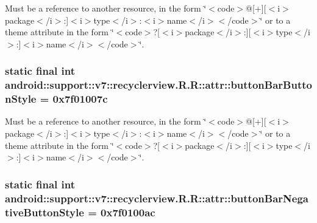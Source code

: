 Must be a reference to another resource, in the form \char`\"{}$<$code$>$@\mbox{[}+\mbox{]}\mbox{[}$<$i$>$package$<$/i$>$:\mbox{]}$<$i$>$type$<$/i$>$:$<$i$>$name$<$/i$>$$<$/code$>$\char`\"{} or to a theme attribute in the form \char`\"{}$<$code$>$?\mbox{[}$<$i$>$package$<$/i$>$:\mbox{]}\mbox{[}$<$i$>$type$<$/i$>$:\mbox{]}$<$i$>$name$<$/i$>$$<$/code$>$\char`\"{}. \hypertarget{classandroid_1_1support_1_1v7_1_1recyclerview_1_1_r_1_1attr_79eb6a5d2ed2cdffcf4437a79a8221f5}{
\subsubsection[{buttonBarButtonStyle}]{\setlength{\rightskip}{0pt plus 5cm}static final int android::support::v7::recyclerview.R.R::attr::buttonBarButtonStyle = 0x7f01007c}}
\label{classandroid_1_1support_1_1v7_1_1recyclerview_1_1_r_1_1attr_79eb6a5d2ed2cdffcf4437a79a8221f5}


Must be a reference to another resource, in the form \char`\"{}$<$code$>$@\mbox{[}+\mbox{]}\mbox{[}$<$i$>$package$<$/i$>$:\mbox{]}$<$i$>$type$<$/i$>$:$<$i$>$name$<$/i$>$$<$/code$>$\char`\"{} or to a theme attribute in the form \char`\"{}$<$code$>$?\mbox{[}$<$i$>$package$<$/i$>$:\mbox{]}\mbox{[}$<$i$>$type$<$/i$>$:\mbox{]}$<$i$>$name$<$/i$>$$<$/code$>$\char`\"{}. \hypertarget{classandroid_1_1support_1_1v7_1_1recyclerview_1_1_r_1_1attr_bed05679368f00aff086f5c9f07469c9}{
\subsubsection[{buttonBarNegativeButtonStyle}]{\setlength{\rightskip}{0pt plus 5cm}static final int android::support::v7::recyclerview.R.R::attr::buttonBarNegativeButtonStyle = 0x7f0100ac}}
\label{classandroid_1_1support_1_1v7_1_1recyclerview_1_1_r_1_1attr_bed05679368f00aff086f5c9f07469c9}


